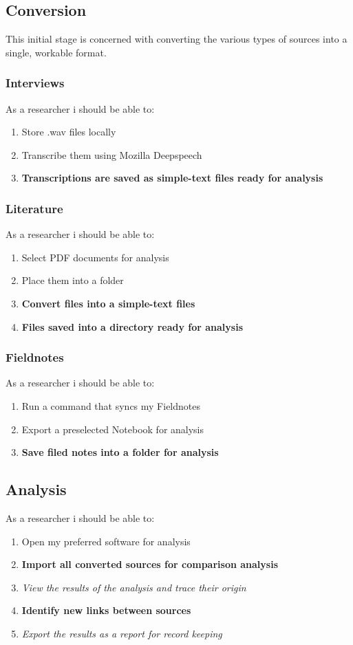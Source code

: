 \documentclass{article}
\begin{document}
\subsection{Conversion}
This initial stage is concerned with converting the various types of sources into a single, workable format.

\subsubsection{Interviews}

As a researcher i should be able to:
\begin{enumerate}
    \item Store .wav files locally
    \item Transcribe them using Mozilla Deepspeech
    \item\textbf{Transcriptions are saved as simple-text files ready for analysis}
\end{enumerate}


\subsubsection{Literature}
As a researcher i should be able to:
\begin{enumerate}
    \item Select PDF documents for analysis
    \item Place them into a folder
    \item\textbf{Convert files into a simple-text files}
    \item\textbf{Files saved into a directory ready for analysis}
\end{enumerate}

\subsubsection{Fieldnotes}
As a researcher i should be able to:
\begin{enumerate}
    \item Run a command that syncs my Fieldnotes
    \item Export a preselected Notebook for analysis
    \item\textbf{Save filed notes into a folder for analysis}
\end{enumerate}

\subsection{Analysis}
As a researcher i should be able to:
\begin{enumerate}
    \item Open my preferred software for analysis
    \item\textbf{Import all converted sources for comparison analysis}
    \item\textit{View the results of the analysis and trace their origin}
    \item\textbf{Identify new links between sources}
    \item\textit{Export the results as a report for record keeping}
\end{enumerate}
\newpage
\end{document}

